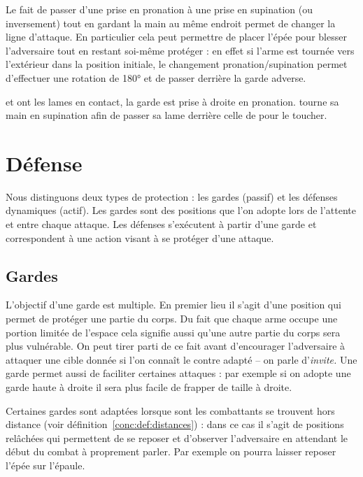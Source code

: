 Le fait de passer d'une prise en pronation à une prise en supination (ou inversement) tout en gardant la main au même endroit permet de changer la ligne d'attaque.
En particulier cela peut permettre de placer l'épée pour blesser l'adversaire tout en restant soi-même protéger : en effet si l'arme est tournée vers l'extérieur dans la position initiale, le changement pronation/supination permet d'effectuer une rotation de \ang{180} et de passer derrière la garde adverse.


\begin{technique}
	\label{struct:tech:changement-ligne}

	\A et \D ont les lames en contact, la garde est prise à droite en pronation.
	\A tourne sa main en supination afin de passer sa lame derrière celle de \D pour le toucher.

\end{technique}


\section{Défense}


Nous distinguons deux types de protection : les gardes (passif) et les défenses dynamiques (actif).
Les gardes sont des positions que l'on adopte lors de l'attente et entre chaque attaque.
Les défenses s'exécutent à partir d'une garde et correspondent à une action visant à se protéger d'une attaque.


\subsection{Gardes}


L'objectif d'une garde est multiple.
En premier lieu il s'agit d'une position qui permet de protéger une partie du corps.
Du fait que chaque arme occupe une portion limitée de l'espace cela signifie aussi qu'une autre partie du corps sera plus vulnérable.
On peut tirer parti de ce fait avant d'encourager l'adversaire à attaquer une cible donnée si l'on connaît le contre adapté -- on parle d'\emph{invite.}
Une garde permet aussi de faciliter certaines attaques : par exemple si on adopte une garde haute à droite il sera plus facile de frapper de taille à droite.

Certaines gardes sont adaptées lorsque sont les combattants se trouvent hors distance (voir définition~\ref{conc:def:distances}) : dans ce cas il s'agit de positions relâchées qui permettent de se reposer et d'observer l'adversaire en attendant le début du combat à proprement parler.
Par exemple on pourra laisser reposer l'épée sur l'épaule.

